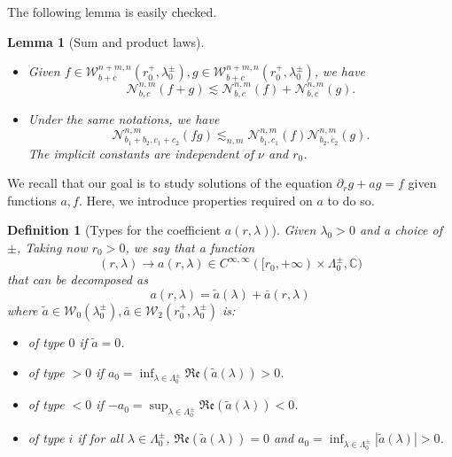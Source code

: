 \documentclass[11 pt]{amsart}
\newtheorem{definition}{Definition}[section]
\newtheorem{lem}{Lemma}[section]
\theoremstyle{definition}
\theoremstyle{remark}
\numberwithin{equation}{section}
\begin{document}
The following lemma is easily checked.

\begin{lem}[Sum and product laws]
  \label{hotshot}
\begin{itemize} 
\item[1)] Given $f \in \mathcal{W}^{n + m, n}_{b + c} (r_0^+,
  \lambda_0^{\pm}), g \in \mathcal{W}^{n + m, n}_{b + c} (r_0^+,
  \lambda_0^{\pm})$, we have
  \[ \mathcal{N}_{b, c}^{n, m} (f + g) \lesssim
     \mathcal{N}_{b,c}^{n, m} (f) +\mathcal{N}_{b, c}^{n, m} (g) . \]
\item[2)] Under the same notations, we have
  \[ \mathcal{N}_{b_1 + b_2, c_1 + c_2}^{n, m} (f g) \lesssim_{n, m}
     \mathcal{N}_{b_1, c_1}^{n, m} (f) \mathcal{N}_{b_2, c_2}^{n, m} (g) . \]
  The implicit constants are independent of $\nu$ and $r_0$.
\end{itemize}
\end{lem}

We recall that our goal is to study solutions of the equation $\partial_r g +
a g = f$ given functions $a, f$. Here, we introduce properties required on $a$
to do so.

\begin{definition}[Types for the coefficient $a(r,\lambda)$]
  \label{cadmissible}Given $\lambda_0 > 0$ and a choice of $\pm$, Taking now $r_0 > 0$, we say that a
  function
  \[ (r, \lambda) \rightarrow a (r, \lambda) \in C^{\infty, \infty} ([r_0, +
     \infty )\times \Lambda_0^{\pm}, \mathbb{C}) \]
  that can be decomposed as
  \[ a (r, \lambda) = \widetilde{a} (\lambda) + \bar{a} (r, \lambda) \]
  where $\widetilde{a} \in \mathcal{W}_0 (\lambda_0^{\pm}), \bar{a} \in
  \mathcal{W}_{2} (r_0^+, \lambda_0^{\pm})$ is:

  \begin{itemize}
\item of type $0$ if $\widetilde{a} = 0$.
  
\item of type $> 0$ if $a_0 = \inf_{\lambda \in \Lambda_0^{\pm}}
  \mathfrak{R}\mathfrak{e} (\widetilde{a} (\lambda)) > 0$.
  
\item of type $< 0$ if $- a_0 = \sup_{\lambda \in \Lambda_0^{\pm}}
  \mathfrak{R}\mathfrak{e} (\widetilde{a} (\lambda)) < 0$.
  
\item of type $i$ if for all $\lambda \in \Lambda_0^{\pm}$,
  $\mathfrak{R}\mathfrak{e} (\widetilde{a} (\lambda)) = 0$ and $a_0 =
  \inf_{\lambda \in \Lambda_0^{\pm}} | \widetilde{a} (\lambda) | > 0$.
  \end{itemize}
\end{definition}
\end{document}
